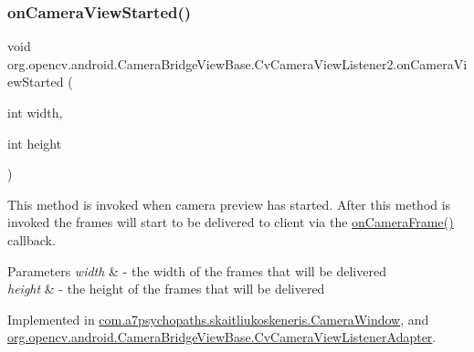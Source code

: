 \subsubsection{\texorpdfstring{on\+Camera\+View\+Started()}{onCameraViewStarted()}}
{\footnotesize\ttfamily void org.\+opencv.\+android.\+Camera\+Bridge\+View\+Base.\+Cv\+Camera\+View\+Listener2.\+on\+Camera\+View\+Started (\begin{DoxyParamCaption}\item[{int}]{width,  }\item[{int}]{height }\end{DoxyParamCaption})}

This method is invoked when camera preview has started. After this method is invoked the frames will start to be delivered to client via the \mbox{\hyperlink{interfaceorg_1_1opencv_1_1android_1_1_camera_bridge_view_base_1_1_cv_camera_view_listener2_aa8cf69267ec5580344728dbadbf6ae0f}{on\+Camera\+Frame()}} callback. 
\begin{DoxyParams}{Parameters}
{\em width} & -\/ the width of the frames that will be delivered \\
\hline
{\em height} & -\/ the height of the frames that will be delivered \\
\hline
\end{DoxyParams}


Implemented in \mbox{\hyperlink{classcom_1_1a7psychopaths_1_1skaitliukoskeneris_1_1_camera_window_a204ec7def65b3ce5a29720b67b03a77c}{com.\+a7psychopaths.\+skaitliukoskeneris.\+Camera\+Window}}, and \mbox{\hyperlink{classorg_1_1opencv_1_1android_1_1_camera_bridge_view_base_1_1_cv_camera_view_listener_adapter_ac3c80b8f6b63af5c9f0e0239afb0ea92}{org.\+opencv.\+android.\+Camera\+Bridge\+View\+Base.\+Cv\+Camera\+View\+Listener\+Adapter}}.

\mbox{\label{interfaceorg_1_1opencv_1_1android_1_1_camera_bridge_view_base_1_1_cv_camera_view_listener2_a0c02fc823ee690e08e6076611cff430b}} 
